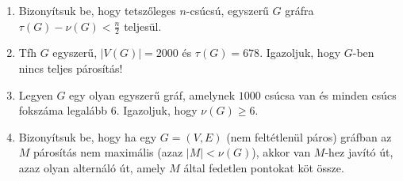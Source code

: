 \documentclass[a4paper, 12pt]{article}
\begin{document}
\begin{enumerate}
\item Bizonyítsuk be, hogy tetszőleges $n$-csúcsú, egyszerű $G$ gráfra $\tau(G)-\nu(G)< \frac n2$ teljesül.%


\item Tfh $G$ egyszerű, $|V(G)|=2000$ és $\tau(G)=678$. Igazoljuk, hogy $G$-ben nincs teljes párosítás! %


\item Legyen $G$ egy olyan egyszerű gráf, amelynek $1000$ csúcsa van és minden csúcs fokszáma legalább $6$. Igazoljuk, hogy $\nu(G)\ge 6$.%






\item Bizonyítsuk be, hogy ha egy $G=(V,E)$ (nem feltétlenül páros) gráfban az $M$ párosítás nem maximális (azaz $|M|<\nu(G)$), akkor van $M$-hez javító út, azaz olyan alternáló út, amely $M$ által fedetlen pontokat köt össze.



\end{enumerate}
\end{document}
